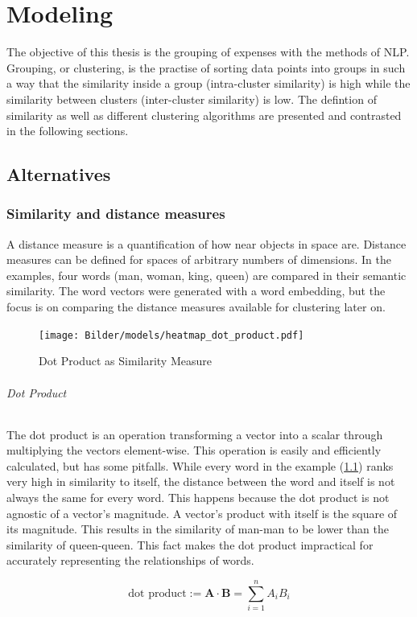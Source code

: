 \chapter{Modeling}
The objective of this thesis is the grouping of expenses with the methods of \ac{NLP}. Grouping, or clustering, is the practise of sorting data points into groups in such a way that the similarity inside a group (intra-cluster similarity) is high while the similarity between clusters (inter-cluster similarity) is low. The defintion of similarity as well as different clustering algorithms are presented and contrasted in the following sections.


\section{Alternatives}
\subsection{Similarity and distance measures}
A distance measure is a quantification of how near objects in space are. Distance measures can be defined for spaces of arbitrary numbers of dimensions. In the examples, four words (man, woman, king, queen) are compared in their semantic similarity. The word vectors were generated with a word embedding, but the focus is on comparing the distance measures available for clustering later on.

		\begin{figure}[!h]
			\centering
			\texttt{[image: Bilder/models/heatmap\_dot\_product.pdf]}
			\caption{Dot Product as Similarity Measure}
			\label{fig:dotproduct-heatmap}
		\end{figure}
	
		\subparagraph{Dot Product}
		The dot product is an operation transforming a vector into a scalar through multiplying the vectors element-wise. This operation is easily and efficiently calculated, but has some pitfalls.
		While every word in the example (\ref{fig:dotproduct-heatmap}) ranks very high in similarity to itself, the distance between the word and itself is not always the same for every word. This happens because the dot product is not agnostic of a vector's magnitude. A vector's product with itself is the square of its magnitude. This results in the similarity of man-man to be lower than the similarity of queen-queen.
		This fact makes the dot product impractical for accurately representing the relationships of words.
	
					\[ 
				\text{dot product} :=  \mathbf{A} \cdot \mathbf{B}= \sum\limits_{i=1}^{n}{A_i  B_i} 
				\]

